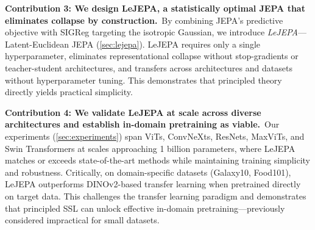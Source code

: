{\bf Contribution 3: We design LeJEPA, a statistically optimal JEPA that eliminates 
collapse by construction.}~By combining JEPA's predictive objective with SIGReg targeting 
the isotropic Gaussian, we introduce {\em LeJEPA}—Latent-Euclidean JEPA 
(\cref{sec:lejepa}). LeJEPA requires only a single hyperparameter, 
eliminates representational collapse without stop-gradients or teacher-student 
architectures, and transfers across architectures and datasets without hyperparameter 
tuning. This demonstrates that principled theory directly yields practical simplicity.

{\bf Contribution 4: We validate LeJEPA at scale across diverse architectures and 
establish in-domain pretraining as viable.}~Our experiments (\cref{sec:experiments}) 
span ViTs, ConvNeXts, ResNets, MaxViTs, and Swin Transformers at scales approaching 
1 billion parameters, where LeJEPA matches or exceeds state-of-the-art methods while 
maintaining training simplicity and robustness. Critically, on domain-specific datasets 
(Galaxy10, Food101), LeJEPA outperforms DINOv2-based transfer learning when pretrained 
directly on target data. This challenges the transfer learning paradigm and demonstrates 
that principled SSL can unlock effective in-domain pretraining—previously considered 
impractical for small datasets.